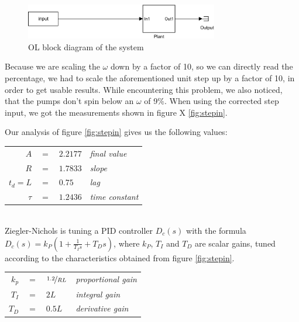 \begin{figure}[H]
    \centering
    \includegraphics[width=0.75\textwidth]{figures/04ExperimentsAndLabWork/OLblock.pdf}
    \caption{OL block diagram of the system}
\label{fig:OL}
\end{figure}

Because we are scaling the $\omega$ down by a factor of 10, so we can directly read the percentage,
we had to scale the aforementioned unit step up by a factor of 10,
in order to get usable results.
While encountering this problem, we also noticed, that the pumps don't spin below an $\omega$ of 9\%.
When using the corrected step input, we got the measurements shown in figure X \ref{fig:stepin}.

Our analysis of figure \ref{fig:stepin} gives us the following values:
\\
\begin{tabular}{r c l l}
	$A$ 	& $=$ & $2.2177$ 	& \footnotesize{\textit{final value}}\\
	$R$ 	& $=$ & $1.7833$ 	& \footnotesize{\textit{slope}}\\
	$t_d=L$	& $=$ & $0.75$ 		& \footnotesize{\textit{lag}}\\
	$\tau$ 	& $=$ & $1.2436$ 	& \footnotesize{\textit{time constant}}
\end{tabular}
\\
Ziegler-Nichols is tuning a PID controller $D_c(s)$ with the formula\\
$D_c(s)=k_P(1+ \frac{1}{T_Is}+T_Ds)$,
where $k_P$, $T_I$ and $T_D$ are scalar gains,
tuned according to the characteristics obtained from figure \ref{fig:stepin}.

\begin{tabular}{r c l l}
	$k_p$ & $=$ & $\nicefrac{1.2}{RL}$	& \footnotesize{\textit{proportional gain}}\\
	$T_I$ & $=$ & $2L$					& \footnotesize{\textit{integral gain}}\\
	$T_D$ & $=$ & $0.5L$ 				& \footnotesize{\textit{derivative gain}}\\
\end{tabular}



